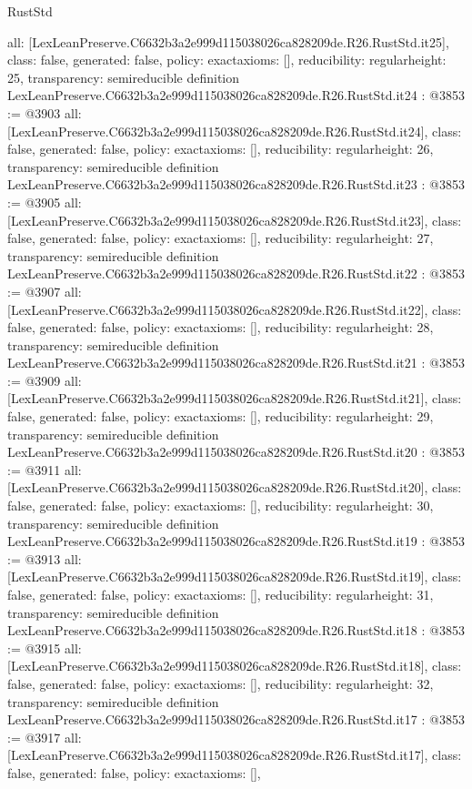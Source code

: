 \begin{lexlean}{RustStd}
\begin{coremodule}
{  all: [LexLeanPreserve.C6632b3a2e999d115038026ca828209de.R26.RustStd.it25],
  class: false,
  generated: false,
  policy: exact{axioms: []},
  reducibility: regular{height: 25},
  transparency: semireducible
}
definition LexLeanPreserve.C6632b3a2e999d115038026ca828209de.R26.RustStd.it24 : @3853 := @3903 {
  all: [LexLeanPreserve.C6632b3a2e999d115038026ca828209de.R26.RustStd.it24],
  class: false,
  generated: false,
  policy: exact{axioms: []},
  reducibility: regular{height: 26},
  transparency: semireducible
}
definition LexLeanPreserve.C6632b3a2e999d115038026ca828209de.R26.RustStd.it23 : @3853 := @3905 {
  all: [LexLeanPreserve.C6632b3a2e999d115038026ca828209de.R26.RustStd.it23],
  class: false,
  generated: false,
  policy: exact{axioms: []},
  reducibility: regular{height: 27},
  transparency: semireducible
}
definition LexLeanPreserve.C6632b3a2e999d115038026ca828209de.R26.RustStd.it22 : @3853 := @3907 {
  all: [LexLeanPreserve.C6632b3a2e999d115038026ca828209de.R26.RustStd.it22],
  class: false,
  generated: false,
  policy: exact{axioms: []},
  reducibility: regular{height: 28},
  transparency: semireducible
}
definition LexLeanPreserve.C6632b3a2e999d115038026ca828209de.R26.RustStd.it21 : @3853 := @3909 {
  all: [LexLeanPreserve.C6632b3a2e999d115038026ca828209de.R26.RustStd.it21],
  class: false,
  generated: false,
  policy: exact{axioms: []},
  reducibility: regular{height: 29},
  transparency: semireducible
}
definition LexLeanPreserve.C6632b3a2e999d115038026ca828209de.R26.RustStd.it20 : @3853 := @3911 {
  all: [LexLeanPreserve.C6632b3a2e999d115038026ca828209de.R26.RustStd.it20],
  class: false,
  generated: false,
  policy: exact{axioms: []},
  reducibility: regular{height: 30},
  transparency: semireducible
}
definition LexLeanPreserve.C6632b3a2e999d115038026ca828209de.R26.RustStd.it19 : @3853 := @3913 {
  all: [LexLeanPreserve.C6632b3a2e999d115038026ca828209de.R26.RustStd.it19],
  class: false,
  generated: false,
  policy: exact{axioms: []},
  reducibility: regular{height: 31},
  transparency: semireducible
}
definition LexLeanPreserve.C6632b3a2e999d115038026ca828209de.R26.RustStd.it18 : @3853 := @3915 {
  all: [LexLeanPreserve.C6632b3a2e999d115038026ca828209de.R26.RustStd.it18],
  class: false,
  generated: false,
  policy: exact{axioms: []},
  reducibility: regular{height: 32},
  transparency: semireducible
}
definition LexLeanPreserve.C6632b3a2e999d115038026ca828209de.R26.RustStd.it17 : @3853 := @3917 {
  all: [LexLeanPreserve.C6632b3a2e999d115038026ca828209de.R26.RustStd.it17],
  class: false,
  generated: false,
  policy: exact{axioms: []},
}
\end{coremodule}
\end{lexlean}
